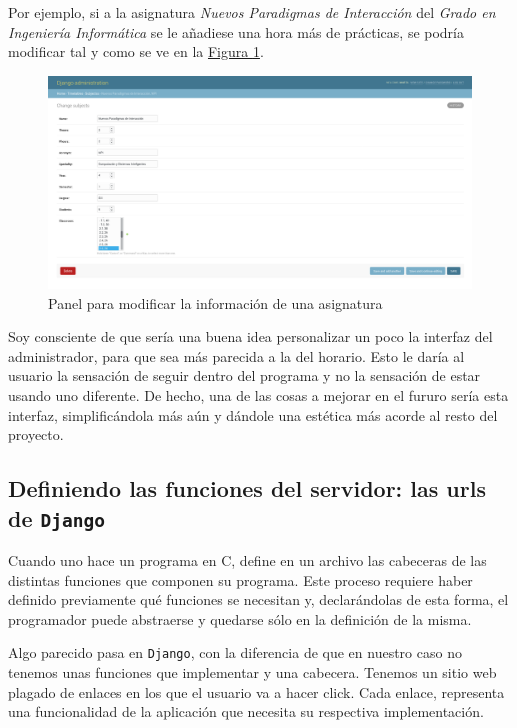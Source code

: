 Por ejemplo, si a la asignatura \textit{Nuevos Paradigmas de Interacción} del \textit{Grado en Ingeniería Informática} se le añadiese una hora más de prácticas, se podría modificar tal y como se ve en la \hyperref[djangoadminmodify]{Figura \ref*{djangoadminmodify}}.

\begin{figure}
\centering
\includegraphics[width=\textwidth]{img/djangoadminmodify}
\caption{Panel para modificar la información de una asignatura}
\label{djangoadminmodify}
\end{figure}

Soy consciente de que sería una buena idea personalizar un poco la interfaz del administrador, para que sea más parecida a la del horario. Esto le daría al usuario la sensación de seguir dentro del programa y no la sensación de estar usando uno diferente. De hecho, una de las cosas a mejorar en el fururo sería esta interfaz, simplificándola más aún y dándole una estética más acorde al resto del proyecto.

\subsection{Definiendo las funciones del servidor: las urls de \texttt{Django}}
Cuando uno hace un programa en C, define en un archivo las cabeceras de las distintas funciones que componen su programa. Este proceso requiere haber definido previamente qué funciones se necesitan y, declarándolas de esta forma, el programador puede abstraerse y quedarse sólo en la definición de la misma.

Algo parecido pasa en \texttt{Django}, con la diferencia de que en nuestro caso no tenemos unas funciones que implementar y una cabecera. Tenemos un sitio web plagado de enlaces en los que el usuario va a hacer click. Cada enlace, representa una funcionalidad de la aplicación que necesita su respectiva implementación.

